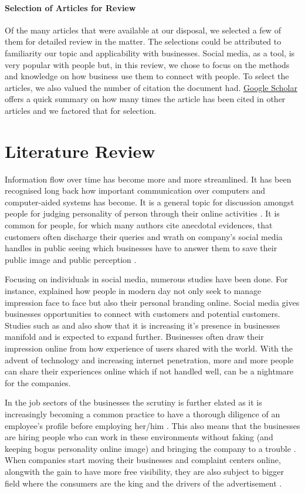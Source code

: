 \documentclass{article}
\begin{document}
\paragraph{Selection of Articles for Review}
Of the many articles that were available at our disposal, we selected a few of them for detailed review in the matter. The selections could be attributed to familiarity our topic and applicability with businesses. Social media, as a tool, is very popular with people but, in this review, we chose to focus on the methods and knowledge on how business use them to connect with people. To select the articles, we also valued the number of citation the document had. \href{https://scholar.google.co.in/}{Google Scholar} offers a quick summary on how many times the article has been cited in other articles and we factored that for selection.

\section{Literature Review}
Information flow over time has become more and more streamlined. It has been recognised long back how important communication over computers and computer-aided systems has become. It is a general topic for discussion amongst people for judging personality of person through their online activities \citep{walther2009}. It is common for people, for which many authors cite anecdotal evidences, that customers often discharge their queries and wrath on company's social media handles in public seeing which businesses have to answer them to save their public image and public perception \citep{mangold2009}.

Focusing on individuals in social media, numerous studies have been done. For instance, \cite{zhao2008} explained how people in modern day not only seek to manage impression face to face but also their personal branding online. Social media gives businesses opportunities to connect with customers and potential customers. Studies such as \cite{madera2012} and \cite{bohnert2010} also show that it is increasing it's presence in businesses manifold and is expected to expand further. Businesses often draw their impression online from how experience of users shared with the world. With the advent of technology and increasing internet penetration, more and more people can share their experiences online which if not handled well, can be a nightmare for the companies. \citep{schwartz2000}

In the job sectors of the businesses the scrutiny is further elated as it is increasingly becoming a common practice to have a thorough diligence of an employee's profile before employing her/him \citep{dekay2009}. This also means that the businesses are hiring people who can work in these environments without faking (and keeping bogus personality online image) and bringing the company to a trouble \citep{westerman2008}. When companies start moving their businesses and complaint centers online, alongwith the gain to have more free visibility, they are also subject to bigger field where the consumers are the king and the drivers of the advertisement \citep{schwartz2000}. 
\end{document}
